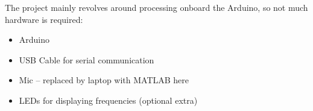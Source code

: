 The project mainly revolves around processing onboard the Arduino, so not much hardware is required:

\begin{itemize}
    \item Arduino
    \item USB Cable for serial communication
    \item Mic -- replaced by laptop with MATLAB here
    \item LEDs for displaying frequencies (optional extra)
\end{itemize}